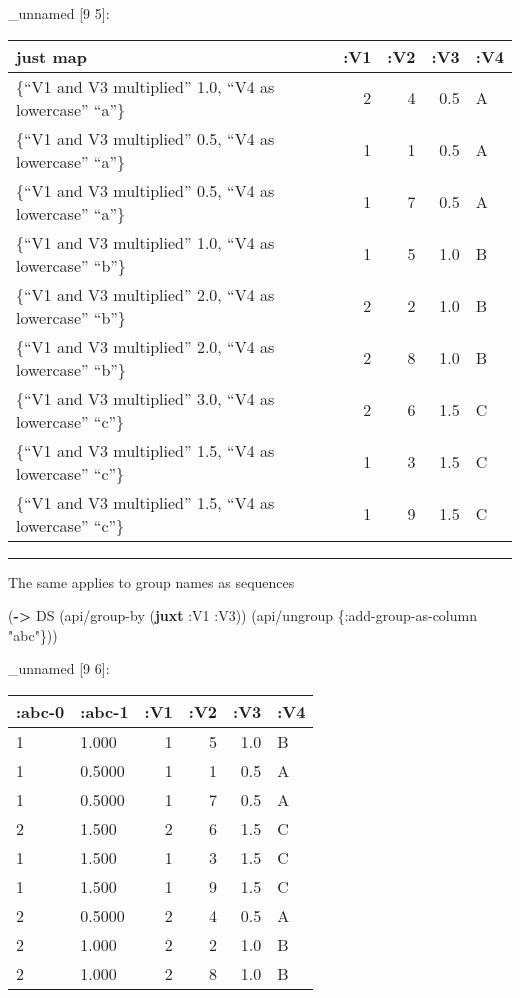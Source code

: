 \documentclass[]{article}
\newenvironment{Shaded}{\begin{snugshade}}{\end{snugshade}}
\newcommand{\KeywordTok}[1]{\textcolor[rgb]{0.13,0.29,0.53}{\textbf{#1}}}
\newcommand{\StringTok}[1]{\textcolor[rgb]{0.31,0.60,0.02}{#1}}
\newcommand{\AttributeTok}[1]{\textcolor[rgb]{0.77,0.63,0.00}{#1}}
\newcommand{\NormalTok}[1]{#1}
\begin{document}
\_unnamed {[}9 5{]}:

\begin{longtable}[]{@{}lrrrl@{}}
\toprule
just map & :V1 & :V2 & :V3 & :V4\tabularnewline
\midrule
\endhead
\{``V1 and V3 multiplied'' 1.0, ``V4 as lowercase'' ``a''\} & 2 & 4 &
0.5 & A\tabularnewline
\{``V1 and V3 multiplied'' 0.5, ``V4 as lowercase'' ``a''\} & 1 & 1 &
0.5 & A\tabularnewline
\{``V1 and V3 multiplied'' 0.5, ``V4 as lowercase'' ``a''\} & 1 & 7 &
0.5 & A\tabularnewline
\{``V1 and V3 multiplied'' 1.0, ``V4 as lowercase'' ``b''\} & 1 & 5 &
1.0 & B\tabularnewline
\{``V1 and V3 multiplied'' 2.0, ``V4 as lowercase'' ``b''\} & 2 & 2 &
1.0 & B\tabularnewline
\{``V1 and V3 multiplied'' 2.0, ``V4 as lowercase'' ``b''\} & 2 & 8 &
1.0 & B\tabularnewline
\{``V1 and V3 multiplied'' 3.0, ``V4 as lowercase'' ``c''\} & 2 & 6 &
1.5 & C\tabularnewline
\{``V1 and V3 multiplied'' 1.5, ``V4 as lowercase'' ``c''\} & 1 & 3 &
1.5 & C\tabularnewline
\{``V1 and V3 multiplied'' 1.5, ``V4 as lowercase'' ``c''\} & 1 & 9 &
1.5 & C\tabularnewline
\bottomrule
\end{longtable}

\begin{center}\rule{0.5\linewidth}{0.5pt}\end{center}

The same applies to group names as sequences

\begin{Shaded}
\begin{Highlighting}[]
\NormalTok{(}\KeywordTok{->}\NormalTok{ DS}
\NormalTok{    (api/group-by (}\KeywordTok{juxt} \AttributeTok{:V1} \AttributeTok{:V3}\NormalTok{))}
\NormalTok{    (api/ungroup \{}\AttributeTok{:add-group-as-column} \StringTok{"abc"}\NormalTok{\}))}
\end{Highlighting}
\end{Shaded}

\_unnamed {[}9 6{]}:

\begin{longtable}[]{@{}llrrrl@{}}
\toprule
:abc-0 & :abc-1 & :V1 & :V2 & :V3 & :V4\tabularnewline
\midrule
\endhead
1 & 1.000 & 1 & 5 & 1.0 & B\tabularnewline
1 & 0.5000 & 1 & 1 & 0.5 & A\tabularnewline
1 & 0.5000 & 1 & 7 & 0.5 & A\tabularnewline
2 & 1.500 & 2 & 6 & 1.5 & C\tabularnewline
1 & 1.500 & 1 & 3 & 1.5 & C\tabularnewline
1 & 1.500 & 1 & 9 & 1.5 & C\tabularnewline
2 & 0.5000 & 2 & 4 & 0.5 & A\tabularnewline
2 & 1.000 & 2 & 2 & 1.0 & B\tabularnewline
2 & 1.000 & 2 & 8 & 1.0 & B\tabularnewline
\bottomrule
\end{longtable}
\end{document}
